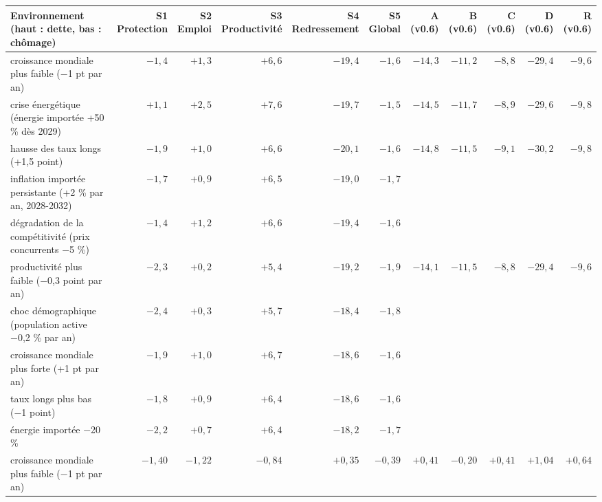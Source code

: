 \begin{tabular}{p{4.8cm}rrrrrrrrrr}\toprule Environnement (haut : dette, bas : chômage) & \makecell{S1\\Protection} & \makecell{S2\\Emploi} & \makecell{S3\\Productivité} & \makecell{S4\\Redressement} & \makecell{S5\\Global} & \makecell{A\\(v0.6)} & \makecell{B\\(v0.6)} & \makecell{C\\(v0.6)} & \makecell{D\\(v0.6)} & \makecell{R\\(v0.6)}\\ \midrule
croissance mondiale plus faible (−1 pt par an) & $-1{,}4$ & $+1{,}3$ & $+6{,}6$ & $-19{,}4$ & $-1{,}6$ & $-14{,}3$ & $-11{,}2$ & $-8{,}8$ & $-29{,}4$ & $-9{,}6$\\
crise énergétique (énergie importée +50 \% dès 2029) & $+1{,}1$ & $+2{,}5$ & $+7{,}6$ & $-19{,}7$ & $-1{,}5$ & $-14{,}5$ & $-11{,}7$ & $-8{,}9$ & $-29{,}6$ & $-9{,}8$\\
hausse des taux longs (+1,5 point) & $-1{,}9$ & $+1{,}0$ & $+6{,}6$ & $-20{,}1$ & $-1{,}6$ & $-14{,}8$ & $-11{,}5$ & $-9{,}1$ & $-30{,}2$ & $-9{,}8$\\
inflation importée persistante (+2 \% par an, 2028-2032) & $-1{,}7$ & $+0{,}9$ & $+6{,}5$ & $-19{,}0$ & $-1{,}7$ &  &  &  &  & \\
dégradation de la compétitivité (prix concurrents −5 \%) & $-1{,}4$ & $+1{,}2$ & $+6{,}6$ & $-19{,}4$ & $-1{,}6$ &  &  &  &  & \\
productivité plus faible (−0,3 point par an) & $-2{,}3$ & $+0{,}2$ & $+5{,}4$ & $-19{,}2$ & $-1{,}9$ & $-14{,}1$ & $-11{,}5$ & $-8{,}8$ & $-29{,}4$ & $-9{,}6$\\
choc démographique (population active −0,2 \% par an) & $-2{,}4$ & $+0{,}3$ & $+5{,}7$ & $-18{,}4$ & $-1{,}8$ &  &  &  &  & \\
croissance mondiale plus forte (+1 pt par an) & $-1{,}9$ & $+1{,}0$ & $+6{,}7$ & $-18{,}6$ & $-1{,}6$ &  &  &  &  & \\
taux longs plus bas (−1 point) & $-1{,}8$ & $+0{,}9$ & $+6{,}4$ & $-18{,}6$ & $-1{,}6$ &  &  &  &  & \\
énergie importée −20 \% & $-2{,}2$ & $+0{,}7$ & $+6{,}4$ & $-18{,}2$ & $-1{,}7$ &  &  &  &  & \\
\midrule
croissance mondiale plus faible (−1 pt par an) & $-1{,}40$ & $-1{,}22$ & $-0{,}84$ & $+0{,}35$ & $-0{,}39$ & $+0{,}41$ & $-0{,}20$ & $+0{,}41$ & $+1{,}04$ & $+0{,}64$\\

\end{tabular}
